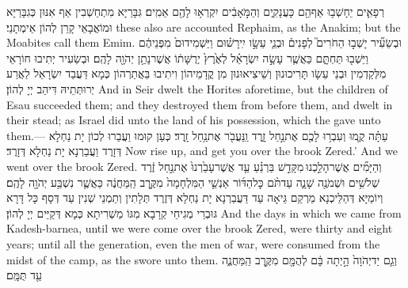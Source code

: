 {רְפָאִ֛ים יֵחָשְׁב֥וּ אַף\maqqaf הֵ֖ם כָּעֲנָקִ֑ים וְהַמֹּ֣אָבִ֔ים יִקְרְא֥וּ לָהֶ֖ם אֵמִֽים׃}
{גִּבָּרַיָּא מִתְחַשְׁבִין אַף אִנּוּן כְּגִבָּרַיָּא וּמוֹאֲבָאֵי קָרַן לְהוֹן אֵימְתָנֵי׃}
{these also are accounted Rephaim, as the Anakim; but the Moabites call them Emim.}{}
{וּבְשֵׂעִ֞יר יָשְׁב֣וּ הַחֹרִים֮ לְפָנִים֒ וּבְנֵ֧י עֵשָׂ֣ו יִֽירָשׁ֗וּם וַיַּשְׁמִידוּם֙ מִפְּנֵיהֶ֔ם וַיֵּשְׁב֖וּ תַּחְתָּ֑ם כַּאֲשֶׁ֧ר עָשָׂ֣ה יִשְׂרָאֵ֗ל לְאֶ֙רֶץ֙ יְרֻשָּׁת֔וֹ אֲשֶׁר\maqqaf נָתַ֥ן יְהֹוָ֖ה לָהֶֽם׃}
{וּבְשֵׂעִיר יְתִיבוּ חוֹרָאֵי מִלְּקַדְמִין וּבְנֵי עֵשָׂו תָּרִיכוּנוּן וְשֵׁיצִיאוּנוּן מִן קֳדָמֵיהוֹן וִיתִיבוּ בַּאֲתַרְהוֹן כְּמָא דַּעֲבַד יִשְׂרָאֵל לַאֲרַע יְרוּתְּתֵיהּ דִּיהַב יְיָ לְהוֹן׃}
{And in Seir dwelt the Horites aforetime, but the children of Esau succeeded them; and they destroyed them from before them, and dwelt in their stead; as Israel did unto the land of his possession, which the \lord\space gave unto them.—}{}
{עַתָּ֗ה קֻ֛מוּ וְעִבְר֥וּ לָכֶ֖ם אֶת\maqqaf נַ֣חַל זָ֑רֶד וַֽנַּעֲבֹ֖ר אֶת\maqqaf נַ֥חַל זָֽרֶד׃}
{כְּעַן קוּמוּ וַעֲבַרוּ לְכוֹן יָת נַחְלָא דְּזָרֶד וַעֲבַרְנָא יָת נַחְלָא דְּזָרֶד׃}
{Now rise up, and get you over the brook Zered.’ And we went over the brook Zered.}{}
{וְהַיָּמִ֞ים אֲשֶׁר\maqqaf הָלַ֣כְנוּ \legarmeh  מִקָּדֵ֣שׁ בַּרְנֵ֗עַ עַ֤ד אֲשֶׁר\maqqaf עָבַ֙רְנוּ֙ אֶת\maqqaf נַ֣חַל זֶ֔רֶד שְׁלֹשִׁ֥ים וּשְׁמֹנֶ֖ה שָׁנָ֑ה עַד\maqqaf תֹּ֨ם כׇּל\maqqaf הַדּ֜וֹר אַנְשֵׁ֤י הַמִּלְחָמָה֙ מִקֶּ֣רֶב הַֽמַּחֲנֶ֔ה כַּאֲשֶׁ֛ר נִשְׁבַּ֥ע יְהֹוָ֖ה לָהֶֽם׃}
{וְיוֹמַיָּא דְּהַלֵּיכְנָא מֵרְקַם גֵּיאָה עַד דַּעֲבַרְנָא יָת נַחְלָא דְּזֶרֶד תְּלָתִין וְתַמְנֵי שְׁנִין עַד דְּסָף כָּל דָּרָא גּוּבְרֵי מְגִיחֵי קְרָבָא מִגּוֹ מַשְׁרִיתָא כְּמָא דְּקַיֵּים יְיָ לְהוֹן׃}
{And the days in which we came from Kadesh-barnea, until we were come over the brook Zered, were thirty and eight years; until all the generation, even the men of war, were consumed from the midst of the camp, as the \lord\space swore unto them.}{}
{וְגַ֤ם יַד\maqqaf יְהֹוָה֙ הָ֣יְתָה בָּ֔ם לְהֻמָּ֖ם מִקֶּ֣רֶב הַֽמַּחֲנֶ֑ה עַ֖ד תֻּמָּֽם׃}
